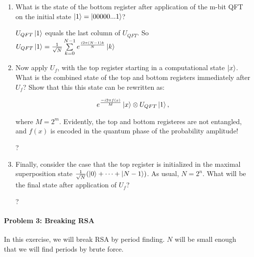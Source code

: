 \documentclass[12pt]{article}
\newcommand{\rsqrt}[1]{\ensuremath{\frac{1}{\sqrt{#1}}}}
\newenvironment{answer}{\begingroup\setlength{\leftskip}{-\leftmargin}\begin{framed}}{\end{framed}\endgroup}
\begin{document}
\begin{enumerate}

    \item What is the state of the bottom register after application of the m-bit QFT on the initial
state $\ket{1} = \ket{00000...1}$?

    \begin{answer}
        $U_{QFT}\ket{1}$ equals the last column of $U_{QFT}$. So $U_{QFT}\ket{1} = \rsqrt{N}\sum\limits_{k = 0}^{N - 1}e^{\frac{i2\pi{}(N - 1)k}{N}}\ket{k}$
    \end{answer}

    \item Now apply $U_f$, with the top register starting in a computational state $\ket{x}$. What is the combined state of the top and bottom registers immediately after $U_f$? Show that this this state can be rewritten as:

    \begin{align*}
        e^{\frac{-i2\pi{}f(x)}{M}}\ket{x}\otimes{}U_{QFT}\ket{1},
    \end{align*}

    where $M = 2^m$. Evidently, the top and bottom registeres are not entangled, and $f(x)$ is encoded in the quantum phase of the probability amplitude!

    \begin{answer}
        ?
    \end{answer}

    \item Finally, consider the case that the top register is initialized in the maximal superposition state $\rsqrt{N}(\ket{0} + \dots + \ket{N - 1})$. As usual, $N = 2^n$. What will be the final state after application of $U_f$?

    \begin{answer}
        ?
    \end{answer}

\end{enumerate}

\paragraph{Problem 3: Breaking RSA}

In this exercise, we will break RSA by period finding. $N$ will be small enough that we will find periods by brute force.
\end{document}
